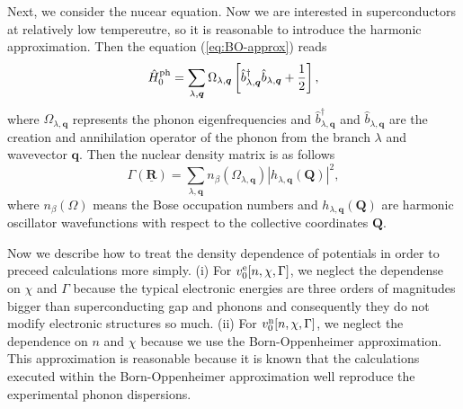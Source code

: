 Next, we consider the nucear equation. Now we are interested in superconductors at relatively low tempereutre, 
so it is reasonable to introduce the harmonic approximation. Then the equation (\ref{eq:BO-approx}) reads
%
\begin{equation}
	\hat{H}^{\rm ph}_{\rm 0} = \sum_{\lambda, \bm{q}}\Omega_{\lambda, \bm{q}}
	\left[\hat{b}^{\dag}_{\lambda, \bm{q}}\hat{b}_{\lambda, \bm{q}} + \frac{1}{2} \right],
	\label{eq:harm}
\end{equation}
%
where $\Omega_{\lambda, \bm{q}}$ represents the phonon eigenfrequencies and 
$\hat{b}^{\dag}_{\lambda, \bm{q}}$ and $\hat{b}_{\lambda, \bm{q}}$ are the creation and annihilation
operator of the phonon from the branch $\lambda$ and wavevector $\bm{q}$.
Then the nuclear density matrix is as follows
%
\begin{equation}
	\Gamma(\underline{\bm{R}}) = \sum_{\lambda, \bm{q}}n_\beta(\Omega_{\lambda, \bm{q}})
	|h_{\lambda, \bm{q}}(\bm{Q})|^2,
\end{equation}
%
where $n_\beta(\Omega)$ means the Bose occupation numbers and $h_{\lambda, \bm{q}}(\bm{Q})$ are
harmonic oscillator wavefunctions with respect to the collective coordinates $\bm{Q}$.

%
Now we describe how to treat the density dependence of potentials in order to preceed calculations more simply.
(i) For $v^{\rm e}_0[n, \chi, \Gamma]$, we neglect the dependense on $\chi$ and $\Gamma$ because 
the typical electronic energies are three orders of magnitudes bigger than superconducting gap and phonons
and consequently they do not modify electronic structures so much.
(ii) For $v^{\rm n}_0[n, \chi, \Gamma]$, we neglect the dependence on $n$ and $\chi$ because
we use the Born-Oppenheimer approximation. This approximation is reasonable because
it is known that the calculations executed within the Born-Oppenheimer approximation well reproduce
the experimental phonon dispersions\cite{Baroni2001}.

